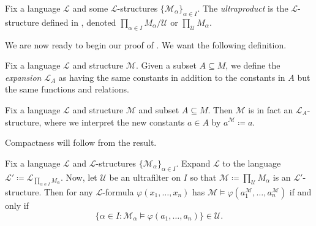 \documentclass[../notes.tex]{subfiles}
\begin{document}
\begin{definition}[ultraproduct]
	Fix a language $\mathcal L$ and some $\mathcal L$-structures $\{\mathcal M_\alpha\}_{\alpha\in I}$. The \textit{ultraproduct} is the $\mathcal L$-structure defined in , denoted $\prod_{\alpha\in I}M_\alpha/\mathcal U$ or $\prod_{\mathcal U}M_\alpha$.
\end{definition}
We are now ready to begin our proof of . We want the following definition.
\begin{definition}[expansion]
	Fix a language $\mathcal L$ and structure $\mathcal M$. Given a subset $A\subseteq M$, we define the \textit{expansion} $\mathcal L_A$ as having the same constants in addition to the constants in $A$ but the same functions and relations.
\end{definition}
\begin{remark}
	Fix a language $\mathcal L$ and structure $\mathcal M$ and subset $A\subseteq M$. Then $\mathcal M$ is in fact an $\mathcal L_A$-structure, where we interpret the new constants $a\in A$ by $a^\mathcal M\coloneqq a$.
\end{remark}
Compactness will follow from the result.
\begin{theorem}[\L{}o\'s] \label{thm:los}
	Fix a language $\mathcal L$ and $\mathcal L$-structures $\{\mathcal M_\alpha\}_{\alpha\in I}$. Expand $\mathcal L$ to the language $\mathcal L'\coloneqq\mathcal L_{\prod_{\alpha\in I}M_\alpha}$. Now, let $\mathcal U$ be an ultrafilter on $I$ so that $\mathcal M\coloneqq\prod_\mathcal UM_\alpha$ is an $\mathcal L'$-structure. Then for any $\mathcal L$-formula $\varphi(x_1,\ldots,x_n)$ has $\mathcal M\models\varphi\left(a_1^\mathcal M,\ldots,a_n^\mathcal M\right)$ if and only if
	\[\{\alpha\in I:\mathcal M_\alpha\models\varphi(a_1,\ldots,a_n)\}\in\mathcal U.\]
\end{theorem}
\end{document}
